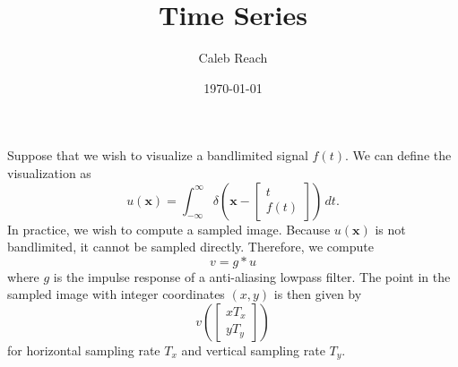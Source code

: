 \documentclass{article}
\title{Time Series}
\author{Caleb Reach}
\date{\today}
\let\V\mathbf
\begin{document}
\maketitle
Suppose that we wish to visualize a bandlimited signal $f(t)$.  We can define the visualization as
\[
u(\V x) = \int_{-\infty}^{\infty} \delta\left(\V x - \begin{bmatrix}t\\f(t)\end{bmatrix}\right)\,dt.
\]
In practice, we wish to compute a sampled image.  Because $u(\V x)$ is not bandlimited, it cannot be sampled directly.  Therefore, we compute
\[
v = g*u
\]
where $g$ is the impulse response of a anti-aliasing lowpass filter.  The point in the sampled image with integer coordinates $(x,y)$ is then given by
\[
v\left(\begin{bmatrix}xT_x\\yT_y\end{bmatrix}\right)
\]
for horizontal sampling rate $T_x$ and vertical sampling rate $T_y$.
\end{document}
